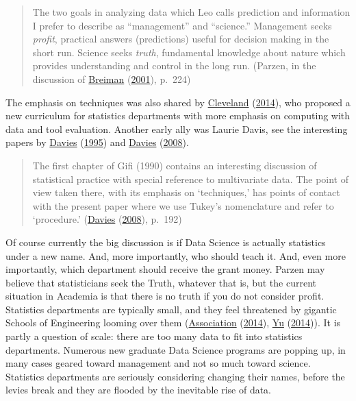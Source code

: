 \documentclass[
  12pt,
]{book}
\begin{document}
\begin{quote}
The two goals in analyzing data which Leo calls prediction and information I prefer to describe as ``management''
and ``science.'' Management seeks \emph{profit}, practical answers (predictions) useful for decision making in the short
run. Science seeks \emph{truth}, fundamental knowledge about nature which provides understanding and control in the
long run. (Parzen, in the discussion of \protect\hyperlink{ref-breiman_01}{Breiman} (\protect\hyperlink{ref-breiman_01}{2001}), p.~224)
\end{quote}

The emphasis on techniques was also shared by \protect\hyperlink{ref-cleveland_14}{Cleveland} (\protect\hyperlink{ref-cleveland_14}{2014}), who proposed a new curriculum for statistics departments with more emphasis on computing with data and tool evaluation. Another early ally was Laurie Davis, see the interesting papers by \protect\hyperlink{ref-davies_95}{Davies} (\protect\hyperlink{ref-davies_95}{1995}) and \protect\hyperlink{ref-davies_08}{Davies} (\protect\hyperlink{ref-davies_08}{2008}).

\begin{quote}
The first chapter of Gifi (1990) contains an interesting discussion of statistical
practice with special reference to multivariate data. The point of view taken there,
with its emphasis on `techniques,' has points of contact with the present paper
where we use Tukey's nomenclature and refer to `procedure.' (\protect\hyperlink{ref-davies_08}{Davies} (\protect\hyperlink{ref-davies_08}{2008}), p.~192)
\end{quote}

Of course currently the big discussion is if Data Science is actually statistics under a new name. And, more importantly, who should teach it. And, even more importantly, which department should receive the grant money. Parzen may believe that statisticians seek the Truth, whatever that is, but the current situation in Academia is that there is no truth if you do not consider profit. Statistics departments are typically small, and they feel threatened by gigantic Schools of Engineering looming over them (\protect\hyperlink{ref-asa_14}{Association} (\protect\hyperlink{ref-asa_14}{2014}), \protect\hyperlink{ref-yu_14}{Yu} (\protect\hyperlink{ref-yu_14}{2014})). It is partly a question of scale: there are too many data to fit into statistics departments. Numerous new graduate Data Science programs are popping up, in many cases geared toward management and not so much toward science. Statistics departments are seriously considering changing their names, before the levies break and they are flooded by the inevitable rise of data.
\end{document}

